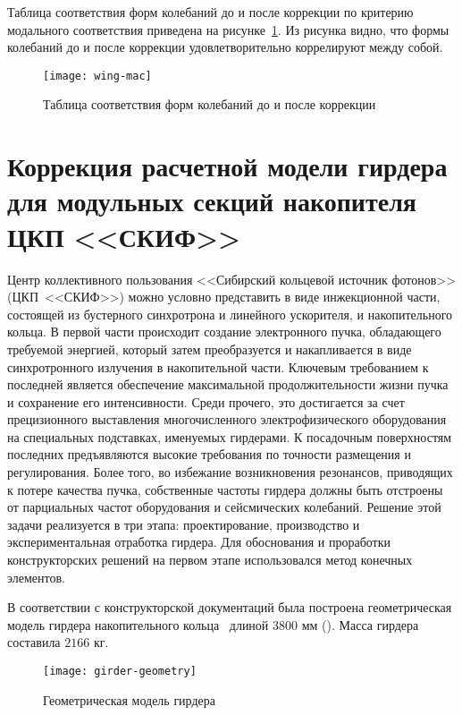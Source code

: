 Таблица соответствия форм колебаний до и после коррекции по критерию модального соответствия приведена на рисунке~\ref{fig:wing-mac}. Из рисунка видно, что формы колебаний до и после коррекции удовлетворительно коррелируют между собой.

\begin{figure}[H]
	\centerfloat
	\texttt{[image: wing-mac]}
	\caption{Таблица соответствия форм колебаний до и после коррекции} \label{fig:wing-mac}
\end{figure}

\section{Коррекция расчетной модели гирдера для модульных секций накопителя ЦКП <<СКИФ>>}

Центр коллективного пользования <<Сибирский кольцевой источник фотонов>> (ЦКП~<<СКИФ>>) можно условно представить в виде инжекционной части, состоящей из бустерного синхротрона и линейного ускорителя, и накопительного кольца. В первой части происходит создание электронного пучка, обладающего требуемой энергией, который затем преобразуется и накапливается в виде синхротронного излучения в накопительной части. Ключевым требованием к последней является обеспечение максимальной продолжительности жизни пучка и сохранение его интенсивности. Среди прочего, это достигается за счет прецизионного выставления многочисленного электрофизического оборудования на специальных подставках, именуемых гирдерами. К посадочным поверхностям последних предъявляются высокие требования по точности размещения и регулирования. Более того, во избежание возникновения резонансов, приводящих к потере качества пучка, собственные частоты гирдера должны быть отстроены от парциальных частот оборудования и сейсмических колебаний. Решение этой задачи реализуется в три этапа: проектирование, производство и экспериментальная отработка гирдера. Для обоснования и проработки конструкторских решений на первом этапе использовался метод конечных элементов.

В соответствии с конструкторской документаций была построена геометрическая модель гирдера накопительного кольца~ длиной $ 3800 $ мм (). Масса гирдера составила $ 2166 $ кг. 

\begin{figure}[H]
	\centering
	\texttt{[image: girder-geometry]}
	\caption{Геометрическая модель гирдера} \label{fig:girder-geometry}
\end{figure}

